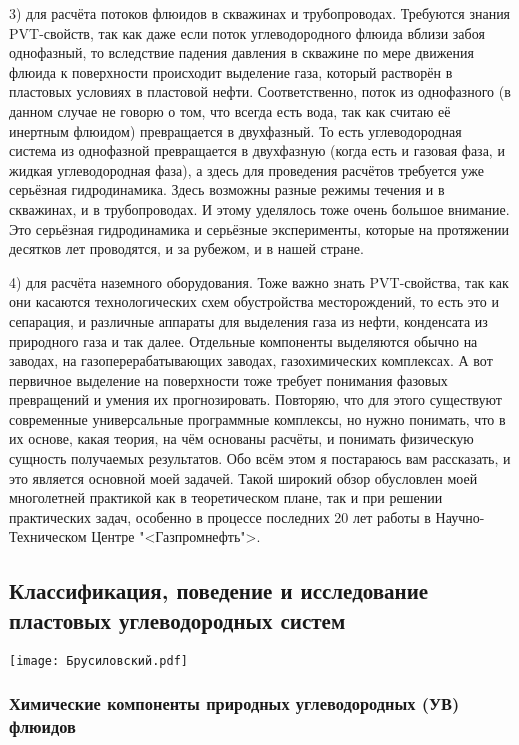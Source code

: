 \documentclass[main.tex]{subfiles}
\begin{document}
3) для расчёта потоков флюидов в скважинах и трубопроводах.
Требуются знания PVT-свойств, так как даже если поток углеводородного флюида вблизи забоя однофазный, то вследствие падения давления в скважине по мере движения флюида к поверхности происходит выделение газа, который растворён в пластовых условиях в пластовой нефти.
Соответственно, поток из однофазного (в данном случае не говорю о том, что всегда есть вода, так как считаю её инертным флюидом) превращается в двухфазный.
То есть углеводородная система из однофазной превращается в двухфазную (когда есть и газовая фаза, и жидкая углеводородная фаза), а здесь для проведения расчётов требуется уже серьёзная гидродинамика.
Здесь возможны разные режимы течения и в скважинах, и в трубопроводах.
И этому уделялось тоже очень большое внимание.
Это серьёзная гидродинамика и серьёзные эксперименты, которые на протяжении десятков лет проводятся, и за рубежом, и в нашей стране.

4) для расчёта наземного оборудования.
Тоже важно знать PVT-свойства, так как они касаются технологических схем обустройства месторождений, то есть это и сепарация, и различные аппараты для выделения газа из нефти, конденсата из природного газа и так далее.
Отдельные компоненты выделяются обычно на заводах, на газоперерабатывающих заводах, газохимических комплексах.
А вот первичное выделение на поверхности тоже требует понимания фазовых превращений и умения их прогнозировать.
Повторяю, что для этого существуют современные универсальные программные комплексы, но нужно понимать, что в их основе, какая теория, на чём основаны расчёты, и понимать физическую сущность получаемых результатов.
Обо всём этом я постараюсь вам рассказать, и это является основной моей задачей.
Такой широкий обзор обусловлен моей многолетней практикой как в теоретическом плане, так и при решении практических задач, особенно в процессе последних 20 лет работы в Научно-Техническом Центре "<Газпромнефть">.

\subsection[\underline{\textbf{Классификация, поведение и исследование пластовых углеводородных систем}}]{Классификация, поведение и исследование пластовых углеводородных систем}

\begin{center}
\texttt{[image: Брусиловский.pdf]}
\end{center}

\subsubsection{Химические компоненты природных углеводородных (УВ) флюидов}
\end{document}
